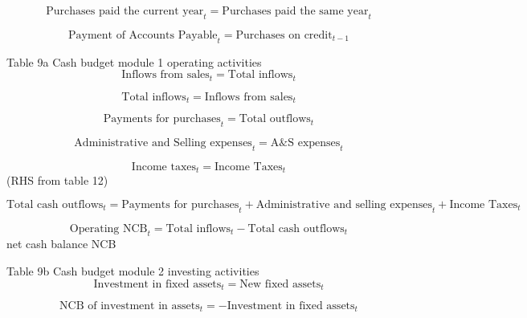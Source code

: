 \documentclass[12pt]{article}
\numberwithin{equation}{section}
\begin{document}
\begin{equation}
	\text{Purchases paid the current year}_{t} = \text{Purchases paid the same year}_{t}
\end{equation}

\begin{equation}
	\text{Payment of Accounts Payable}_{t} = \text{Purchases on credit}_{t-1}
\end{equation}


Table 9a Cash budget module 1 operating activities
\begin{equation}
	\text{Inflows from sales}_{t} = \text{Total inflows}_{t}
\end{equation}

\begin{equation}
	\text{Total inflows}_{t} = \text{Inflows from sales}_{t}
\end{equation}

\begin{equation}
	\text{Payments for purchases}_{t} = \text{Total outflows}_{t}
\end{equation}

\begin{equation}
	\text{Administrative and Selling expenses}_{t} = \text{A\&S expenses}_{t}
\end{equation}

\begin{equation}
	\text{Income taxes}_{t} = \text{Income Taxes}_{t}
\end{equation}
(RHS from table 12)

\begin{equation}
	\text{Total cash outflows}_{t} = \text{Payments for purchases}_{t} + \text{Administrative and selling expenses}_{t} + \text{Income Taxes}_{t}
\end{equation}

\begin{equation}
	\text{Operating NCB}_{t} = \text{Total inflows}_{t} - \text{Total cash outflows}_{t}
\end{equation}
net cash balance NCB

Table 9b Cash budget module 2 investing activities
\begin{equation}
	\text{Investment in fixed assets}_{t} = \text{New fixed assets}_{t}
\end{equation}

\begin{equation}
	\text{NCB of investment in assets}_{t} = - \text{Investment in fixed assets}_{t}
\end{equation}
\end{document}
